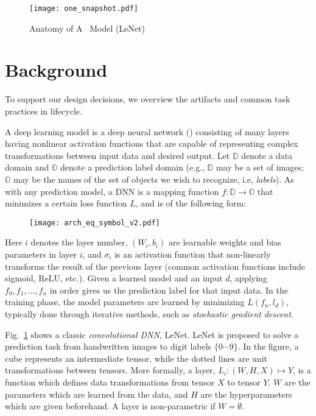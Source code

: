 \documentclass[conference]{IEEEtran}
\begin{document}
\begin{figure}[!t]
\centering
\texttt{[image: one\_snapshot.pdf]}
\caption{Anatomy of A \dnn\ Model (LeNet)}
\label{fig:onesnapshot}
\end{figure}


\section{Background}
\label{sec:preliminary}


To support our design decisions, we overview the artifacts and common task practices in \dnn\modeling lifecycle. 


A deep learning model is a deep neural network (\dnn) consisting of many layers having nonlinear activation functions that are capable of representing complex transformations between input data and desired output.
Let $\mathbb D$ denote a data domain and $\mathbb O$ denote a prediction label domain (e.g., $\mathbb D$ may be a set of images; $\mathbb O$ may be the names of the set of objects we wish to recognize, i.e, {\em labels}). As with any prediction model, a DNN is a mapping function $f:\mathbb{D}\to\mathbb{O}$ that
minimizes a certain loss function $L$, and is of the following form:\\
\begin{figure}[!h]
\centering
\texttt{[image: arch\_eq\_symbol\_v2.pdf]}
\end{figure}


\noindent Here $i$ denotes the layer number,  $(W_i, b_i)$ are learnable weights and bias parameters in layer $i$, and $\sigma_i$ is an activation function that non-linearly transforms the result of the previous layer (common activation functions include sigmoid, ReLU, etc.). 
Given a learned model and an input $d$, applying $f_0, f_1, ..., f_{n}$ in order gives us the prediction label for that input data. 
In the training phase, the model parameters are learned by minimizing $L(f_{n}, l_d)$,
typically done through iterative methods, such as {\em stochastic gradient descent}.




Fig.~\ref{fig:onesnapshot} shows a classic {\em convolutional DNN}, LeNet. LeNet is proposed to solve a prediction task from handwritten images to digit labels $\{0\cdots9\}$. In the figure, a cube represents an intermediate tensor, while the dotted lines are unit transformations between tensors. More formally, a layer, $L_i : (W,H,X) \mapsto  Y$, is a function which defines data transformations from tensor $X$ to tensor $Y$. $W$ are the parameters which are learned from the data, and $H$ are the hyperparameters which are given beforehand. A layer is non-parametric if $W = \emptyset$. 
\end{document}
